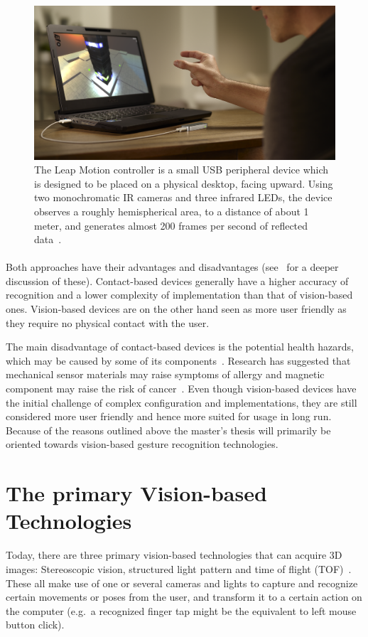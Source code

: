 \documentclass[UKenglish]{ifimaster}
\begin{document}
\begin{figure}%
	\includegraphics[width=\linewidth]{pictures/leapmotion2.png}
	\caption{The Leap Motion controller is a small USB peripheral device which is designed to be placed on a physical desktop, facing upward. Using two monochromatic IR cameras and three infrared LEDs, the device observes a roughly hemispherical area, to a distance of about 1 meter, and generates almost 200 frames per second of reflected data~\citep{LeapMotion2016}.}
	\label{fig:leapmotion}
\end{figure} 

\paragraph{}Both approaches have their advantages and disadvantages (see~\citet{Rautaray2015} for a deeper discussion of these). Contact-based devices generally have a higher accuracy of recognition and a lower complexity of implementation than that of vision-based ones. Vision-based devices are on the other hand seen as more user friendly as they require no physical contact with the user. 

The main disadvantage of contact-based devices is the potential health hazards, which may be caused by some of its components~\citep{Schultz2003}. Research has suggested that mechanical sensor materials may raise symptoms of allergy and magnetic component may raise the risk of cancer~\citep{Nishikawa2003}. Even though vision-based devices have the initial challenge of complex configuration and implementations, they are still considered more user friendly and hence more suited for usage in long run. Because of the reasons outlined above the master's thesis will primarily be oriented towards vision-based gesture recognition technologies. 

\section{The primary Vision-based Technologies}
Today, there are three primary vision-based technologies that can acquire 3D images: Stereoscopic vision, structured light pattern and time of flight (TOF)~\citep{Ko2012}.
These all make use of one or several cameras and lights to capture and recognize certain movements or poses from the user, and transform it to a certain action on the computer (e.g.~a recognized finger tap might be the equivalent to left mouse button click). 
\end{document}
